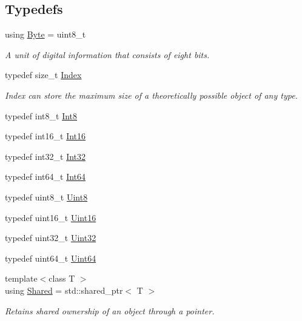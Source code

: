 \subsection*{Typedefs}
\begin{DoxyCompactItemize}
\item 
using \hyperlink{namespacelibrary_1_1core_1_1types_ae37635b89098069fb3b8c5181edd0945}{Byte} = uint8\+\_\+t
\begin{DoxyCompactList}\small\item\em A unit of digital information that consists of eight bits. \end{DoxyCompactList}\item 
typedef size\+\_\+t \hyperlink{namespacelibrary_1_1core_1_1types_ad87eeb821d7067ec94e06ed1980d6350}{Index}
\begin{DoxyCompactList}\small\item\em Index can store the maximum size of a theoretically possible object of any type. \end{DoxyCompactList}\item 
typedef int8\+\_\+t \hyperlink{namespacelibrary_1_1core_1_1types_a31bb31acb8e07271b66571cf8e6eafee}{Int8}
\item 
typedef int16\+\_\+t \hyperlink{namespacelibrary_1_1core_1_1types_a150247fa2cd1b258b8e5950efcaecfc9}{Int16}
\item 
typedef int32\+\_\+t \hyperlink{namespacelibrary_1_1core_1_1types_acaf2598d96f2239dc55e54628da77876}{Int32}
\item 
typedef int64\+\_\+t \hyperlink{namespacelibrary_1_1core_1_1types_aaa5045e0d51ac9cff3c0aeff2b792c8c}{Int64}
\item 
typedef uint8\+\_\+t \hyperlink{namespacelibrary_1_1core_1_1types_a2fb690dd0eb982f92a642dbd0c985662}{Uint8}
\item 
typedef uint16\+\_\+t \hyperlink{namespacelibrary_1_1core_1_1types_a058aff3dd2661e18ff83255059561123}{Uint16}
\item 
typedef uint32\+\_\+t \hyperlink{namespacelibrary_1_1core_1_1types_a17d56f5d789f5d86d10828c112c77be2}{Uint32}
\item 
typedef uint64\+\_\+t \hyperlink{namespacelibrary_1_1core_1_1types_a52eb5d32552dff72468cc9acee3dd70e}{Uint64}
\item 
{\footnotesize template$<$class T $>$ }\\using \hyperlink{namespacelibrary_1_1core_1_1types_a3dae1a00f899bac0366794fa85eda8ee}{Shared} = std\+::shared\+\_\+ptr$<$ T $>$
\begin{DoxyCompactList}\small\item\em Retains shared ownership of an object through a pointer. \end{DoxyCompactList}\item 

\end{DoxyCompactItemize}
